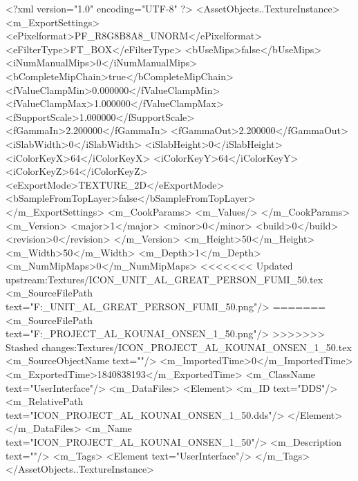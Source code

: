 <?xml version="1.0" encoding="UTF-8" ?>
<AssetObjects..TextureInstance>
	<m_ExportSettings>
		<ePixelformat>PF_R8G8B8A8_UNORM</ePixelformat>
		<eFilterType>FT_BOX</eFilterType>
		<bUseMips>false</bUseMips>
		<iNumManualMips>0</iNumManualMips>
		<bCompleteMipChain>true</bCompleteMipChain>
		<fValueClampMin>0.000000</fValueClampMin>
		<fValueClampMax>1.000000</fValueClampMax>
		<fSupportScale>1.000000</fSupportScale>
		<fGammaIn>2.200000</fGammaIn>
		<fGammaOut>2.200000</fGammaOut>
		<iSlabWidth>0</iSlabWidth>
		<iSlabHeight>0</iSlabHeight>
		<iColorKeyX>64</iColorKeyX>
		<iColorKeyY>64</iColorKeyY>
		<iColorKeyZ>64</iColorKeyZ>
		<eExportMode>TEXTURE_2D</eExportMode>
		<bSampleFromTopLayer>false</bSampleFromTopLayer>
	</m_ExportSettings>
	<m_CookParams>
		<m_Values/>
	</m_CookParams>
	<m_Version>
		<major>1</major>
		<minor>0</minor>
		<build>0</build>
		<revision>0</revision>
	</m_Version>
	<m_Height>50</m_Height>
	<m_Width>50</m_Width>
	<m_Depth>1</m_Depth>
	<m_NumMipMaps>0</m_NumMipMaps>
<<<<<<< Updated upstream:Textures/ICON_UNIT_AL_GREAT_PERSON_FUMI_50.tex
	<m_SourceFilePath text="F:\DT\lilyimages\gpportrait\ICON_UNIT_AL_GREAT_PERSON_FUMI_50.png"/>
=======
	<m_SourceFilePath text="F:\DT\lilyimages\projects\ICON_PROJECT_AL_KOUNAI_ONSEN_1_50.png"/>
>>>>>>> Stashed changes:Textures/ICON_PROJECT_AL_KOUNAI_ONSEN_1_50.tex
	<m_SourceObjectName text=""/>
	<m_ImportedTime>0</m_ImportedTime>
	<m_ExportedTime>1840838193</m_ExportedTime>
	<m_ClassName text="UserInterface"/>
	<m_DataFiles>
		<Element>
			<m_ID text="DDS"/>
			<m_RelativePath text="ICON_PROJECT_AL_KOUNAI_ONSEN_1_50.dds"/>
		</Element>
	</m_DataFiles>
	<m_Name text="ICON_PROJECT_AL_KOUNAI_ONSEN_1_50"/>
	<m_Description text=""/>
	<m_Tags>
		<Element text="UserInterface"/>
	</m_Tags>
</AssetObjects..TextureInstance>


